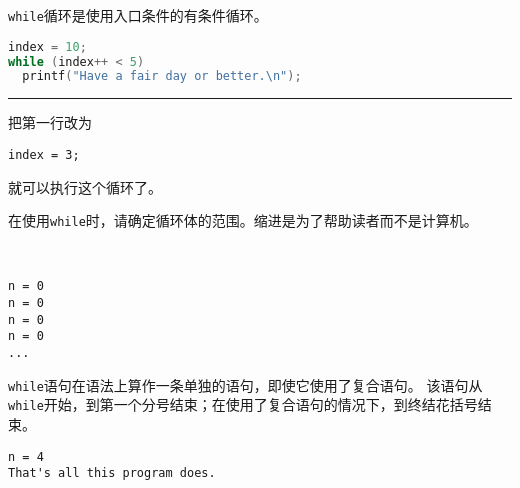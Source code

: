 \begin{frame}[fragile]
\lstinline|while|循环是使用入口条件的有条件循环。
\end{frame}

\begin{frame}[fragile]
\begin{lstlisting}[language=c]
index = 10;
while (index++ < 5)
  printf("Have a fair day or better.\n");
\end{lstlisting}
\rule{\textwidth}{1mm}\pause 

把第一行改为
\begin{lstlisting}
index = 3;
\end{lstlisting}
就可以执行这个循环了。
\end{frame}

\begin{frame}[fragile]
在使用\lstinline|while|时，请确定循环体的范围。缩进是为了帮助读者而不是计算机。
\end{frame}

\begin{frame}[fragile]
  \begin{minipage}{0.6\textwidth}
    
  \end{minipage} ~~~~\pause 
  \begin{minipage}{0.3\textwidth}
\begin{lstlisting}[backgroundcolor=\color{red!10}]
n = 0
n = 0
n = 0
n = 0
... 
\end{lstlisting}    
  \end{minipage}
\end{frame}

\begin{frame}[fragile]
\lstinline|while|语句在语法上算作一条单独的语句，即使它使用了复合语句。
该语句从\lstinline|while|开始，到第一个分号结束；在使用了复合语句的情况下，到终结花括号结束。
\end{frame}

\begin{frame}[fragile]

\pause 
\begin{lstlisting}[backgroundcolor=\color{red!10}]
n = 4
That's all this program does.
\end{lstlisting}
\end{frame}

